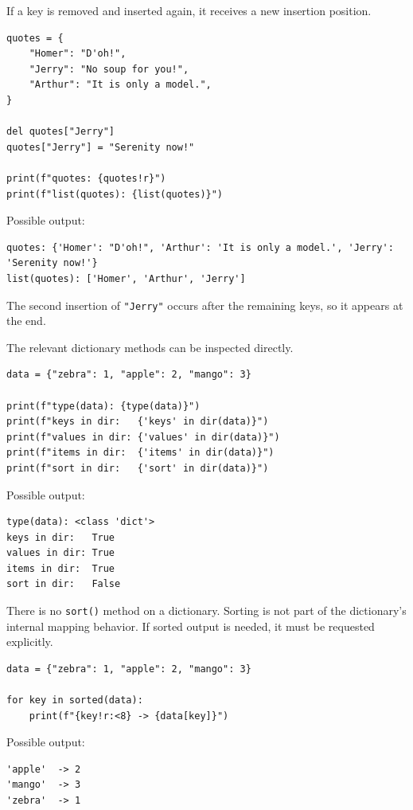 If a key is removed and inserted again, it receives a new insertion position.

\begin{verbatim}
quotes = {
    "Homer": "D'oh!",
    "Jerry": "No soup for you!",
    "Arthur": "It is only a model.",
}

del quotes["Jerry"]
quotes["Jerry"] = "Serenity now!"

print(f"quotes: {quotes!r}")
print(f"list(quotes): {list(quotes)}")
\end{verbatim}

Possible output:

\begin{verbatim}
quotes: {'Homer': "D'oh!", 'Arthur': 'It is only a model.', 'Jerry': 'Serenity now!'}
list(quotes): ['Homer', 'Arthur', 'Jerry']
\end{verbatim}

The second insertion of \texttt{"Jerry"} occurs after the remaining keys, so it appears at the end.

The relevant dictionary methods can be inspected directly.

\begin{verbatim}
data = {"zebra": 1, "apple": 2, "mango": 3}

print(f"type(data): {type(data)}")
print(f"keys in dir:   {'keys' in dir(data)}")
print(f"values in dir: {'values' in dir(data)}")
print(f"items in dir:  {'items' in dir(data)}")
print(f"sort in dir:   {'sort' in dir(data)}")
\end{verbatim}

Possible output:

\begin{verbatim}
type(data): <class 'dict'>
keys in dir:   True
values in dir: True
items in dir:  True
sort in dir:   False
\end{verbatim}

There is no \texttt{sort()} method on a dictionary. Sorting is not part of the dictionary's internal mapping behavior. If sorted output is needed, it must be requested explicitly.

\begin{verbatim}
data = {"zebra": 1, "apple": 2, "mango": 3}

for key in sorted(data):
    print(f"{key!r:<8} -> {data[key]}")
\end{verbatim}

Possible output:

\begin{verbatim}
'apple'  -> 2
'mango'  -> 3
'zebra'  -> 1
\end{verbatim}

